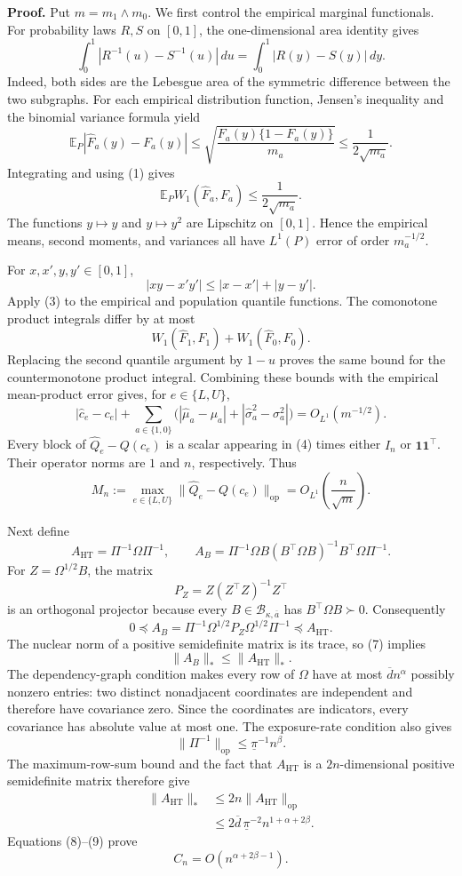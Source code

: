 \textbf{Proof.}
Put \(m=m_1\wedge m_0\).  We first control the empirical marginal functionals.  For probability laws \(R,S\) on \([0,1]\), the one-dimensional area identity gives
\[
\int_0^1|R^{-1}(u)-S^{-1}(u)|\,du
=\int_0^1|R(y)-S(y)|\,dy.
\tag{1}
\]
Indeed, both sides are the Lebesgue area of the symmetric difference between the two subgraphs.  For each empirical distribution function, Jensen's inequality and the binomial variance formula yield
\[
\mathbb E_P|\widehat F_a(y)-F_a(y)|
\le \sqrt{\frac{F_a(y)\{1-F_a(y)\}}{m_a}}
\le \frac{1}{2\sqrt{m_a}}.
\]
Integrating and using (1) gives
\[
\mathbb E_P W_1(\widehat F_a,F_a)\le \frac{1}{2\sqrt{m_a}}.
\tag{2}
\]
The functions \(y\mapsto y\) and \(y\mapsto y^2\) are Lipschitz on \([0,1]\).  Hence the empirical means, second moments, and variances all have \(L^1(P)\) error of order \(m_a^{-1/2}\).

For \(x,x',y,y'\in[0,1]\),
\[
|xy-x'y'|\le |x-x'|+|y-y'|.
\tag{3}
\]
Apply (3) to the empirical and population quantile functions.  The comonotone product integrals differ by at most
\[
W_1(\widehat F_1,F_1)+W_1(\widehat F_0,F_0).
\]
Replacing the second quantile argument by \(1-u\) proves the same bound for the countermonotone product integral.  Combining these bounds with the empirical mean-product error gives, for \(e\in\{L,U\}\),
\[
|\widehat c_e-c_e|+
\sum_{a\in\{1,0\}}
\bigl(|\widehat\mu_a-\mu_a|+|\widehat\sigma_a^2-\sigma_a^2|\bigr)
=O_{L^1}(m^{-1/2}).
\tag{4}
\]
Every block of \(\widehat Q_e-Q(c_e)\) is a scalar appearing in (4) times either \(I_n\) or \(\mathbf1\mathbf1^{\top}\).  Their operator norms are \(1\) and \(n\), respectively.  Thus
\[
M_n:=\max_{e\in\{L,U\}}
\lVert\widehat Q_e-Q(c_e)\rVert_{\mathrm{op}}
=O_{L^1}\!\left(\frac{n}{\sqrt m}\right).
\tag{5}
\]

Next define
\[
A_{\mathrm{HT}}=\Pi^{-1}\Omega\Pi^{-1},
\qquad
A_B=\Pi^{-1}\Omega B(B^{\top}\Omega B)^{-1}B^{\top}\Omega\Pi^{-1}.
\tag{6}
\]
For \(Z=\Omega^{1/2}B\), the matrix
\[
P_Z=Z(Z^{\top}Z)^{-1}Z^{\top}
\]
is an orthogonal projector because every \(B\in\mathcal B_{\kappa,\overline a}\) has \(B^{\top}\Omega B\succ0\).  Consequently
\[
0\preceq A_B
=\Pi^{-1}\Omega^{1/2}P_Z\Omega^{1/2}\Pi^{-1}
\preceq A_{\mathrm{HT}}.
\tag{7}
\]
The nuclear norm of a positive semidefinite matrix is its trace, so (7) implies
\[
\lVert A_B\rVert_*\le\lVert A_{\mathrm{HT}}\rVert_*.
\tag{8}
\]
The dependency-graph condition makes every row of \(\Omega\) have at most \(\overline d n^\alpha\) possibly nonzero entries: two distinct nonadjacent coordinates are independent and therefore have covariance zero.  Since the coordinates are indicators, every covariance has absolute value at most one.  The exposure-rate condition also gives
\[
\lVert\Pi^{-1}\rVert_{\mathrm{op}}
\le\underline\pi^{-1}n^\beta.
\]
The maximum-row-sum bound and the fact that \(A_{\mathrm{HT}}\) is a \(2n\)-dimensional positive semidefinite matrix therefore give
\[
\begin{aligned}
\lVert A_{\mathrm{HT}}\rVert_*
&\le2n\lVert A_{\mathrm{HT}}\rVert_{\mathrm{op}}\\
&\le2\overline d\,\underline\pi^{-2}
n^{1+\alpha+2\beta}.
\end{aligned}
\tag{9}
\]
Equations (8)--(9) prove
\[
C_n=O(n^{\alpha+2\beta-1}).
\tag{10}
\]

